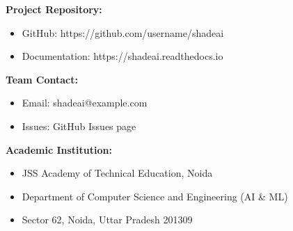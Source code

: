 \textbf{Project Repository:}
\begin{itemize}
    \item GitHub: https://github.com/username/shadeai
    \item Documentation: https://shadeai.readthedocs.io
\end{itemize}

\textbf{Team Contact:}
\begin{itemize}
    \item Email: shadeai@example.com
    \item Issues: GitHub Issues page
\end{itemize}

\textbf{Academic Institution:}
\begin{itemize}
    \item JSS Academy of Technical Education, Noida
    \item Department of Computer Science and Engineering (AI \& ML)
    \item Sector 62, Noida, Uttar Pradesh 201309
\end{itemize}
